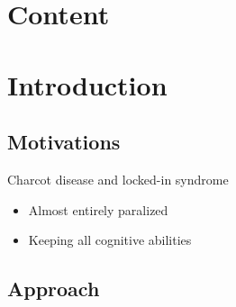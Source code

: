 \documentclass[graphics]{beamer}
\begin{document}
\section*{Content}
\begin{frame}
	\tableofcontents
\end{frame}

\section{Introduction}
\subsection{Motivations}

\begin{frame}{Charcot disease and locked-in syndrome}
	\begin{center}
		\begin{itemize}
			\item Almost entirely paralized
			\item Keeping all cognitive abilities
		\end{itemize}
	\end{center}
\end{frame}

\subsection{Approach}

\newcommand{\background}[5]{%
	\begin{pgfonlayer}{background}
		\path (#4.west |- #1.north)+(-0.25,0.5) node (a1) {};
		\path (#2.east |- #3.south)+(+0.25,-0.25) node (a2) {};
		\path[fill=yellow!20,rounded corners, draw=black!50,dashed,thick]
		(a1) rectangle (a2);%
		\path (a1.east |- a1.south)+(1.5,-.1) node (u1)[]
		{\scriptsize\textit{#5}};
	\end{pgfonlayer}}
	
\end{document}
